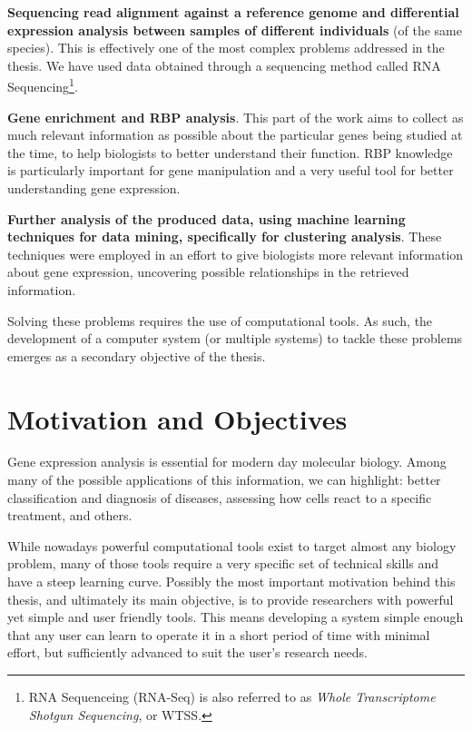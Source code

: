 \documentclass[9pt,a4paper]{extarticle}
\begin{document}
\begin{multicols}{2}
  \textbf{Sequencing read alignment against a reference genome and differential
  expression analysis between samples of different individuals} (of the same
  species). This is effectively one of the most complex problems addressed in
  the thesis. We have used data obtained through a sequencing method called RNA
  Sequencing\footnote{RNA Sequenceing (RNA-Seq) is also referred to as
  \textit{Whole Transcriptome Shotgun Sequencing}, or WTSS.}.

  \textbf{Gene enrichment and RBP analysis}. This part of the work aims to
  collect as much relevant information as possible about the particular genes
  being studied at the time, to help biologists to better understand their
  function. RBP knowledge is particularly important for gene manipulation and a
  very useful tool for better understanding gene expression.

  \textbf{Further analysis of the produced data, using machine learning
  techniques for data mining, specifically for clustering analysis}. These
  techniques were employed in an effort to give biologists more relevant
  information about gene expression, uncovering possible relationships in the
  retrieved information.

Solving these problems requires the use of computational tools. As such, the
development of a computer system (or multiple systems) to tackle these problems
emerges as a secondary objective of the thesis.

\section{Motivation and Objectives} \label{sec:motivation}

Gene expression analysis is essential for modern day molecular biology. Among
many of the possible applications of this information, we can highlight: better
classification and diagnosis of diseases, assessing how cells react to a
specific treatment, and others.

While nowadays powerful computational tools exist to target almost any biology
problem, many of those tools require a very specific set of technical skills and
have a steep learning curve. Possibly the most important motivation behind this
thesis, and ultimately its main objective, is to provide researchers with
powerful yet simple and user friendly tools. This means developing a system
simple enough that any user can learn to operate it in a short period of time
with minimal effort, but sufficiently advanced to suit the user's research
needs.


\end{multicols}
\end{document}
